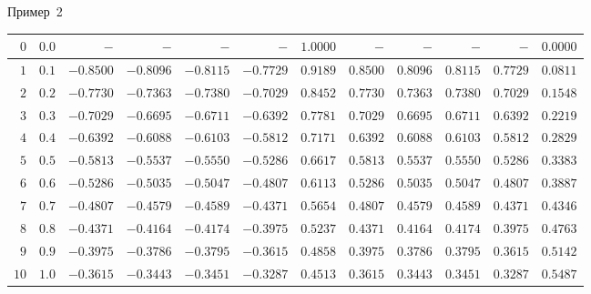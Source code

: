 \documentclass[aspectratio=169, mathserif]{beamer}	%
\begin{document}
\begin{frame}[fragile, label=c]{Пример~2}
\begin{longtable}{|r|r|r|r|r|r|r|r|r|r|r|r|}
	$0$ & $0.0$ & $-$ & $-$ & $-$ & $-$ & $1.0000$ & $-$ & $-$ & $-$ & $-$ & $0.0000$\\
	\hline
	$1$ & $0.1$ & $-0.8500$ & $-0.8096$ & $-0.8115$ & $-0.7729$ & $0.9189$ & $0.8500$ & $0.8096$ & $0.8115$ & $0.7729$ & $0.0811$\\
	\hline
	$2$ & $0.2$ & $-0.7730$ & $-0.7363$ & $-0.7380$ & $-0.7029$ & $0.8452$ & $0.7730$ & $0.7363$ & $0.7380$ & $0.7029$ & $0.1548$\\
	\hline
	$3$ & $0.3$ & $-0.7029$ & $-0.6695$ & $-0.6711$ & $-0.6392$ & $0.7781$ & $0.7029$ & $0.6695$ & $0.6711$ & $0.6392$ & $0.2219$\\
	\hline
	$4$ & $0.4$ & $-0.6392$ & $-0.6088$ & $-0.6103$ & $-0.5812$ & $0.7171$ & $0.6392$ & $0.6088$ & $0.6103$ & $0.5812$ & $0.2829$\\
	\hline
	$5$ & $0.5$ & $-0.5813$ & $-0.5537$ & $-0.5550$ & $-0.5286$ & $0.6617$ & $0.5813$ & $0.5537$ & $0.5550$ & $0.5286$ & $0.3383$\\
	\hline
	$6$ & $0.6$ & $-0.5286$ & $-0.5035$ & $-0.5047$ & $-0.4807$ & $0.6113$ & $0.5286$ & $0.5035$ & $0.5047$ & $0.4807$ & $0.3887$\\
	\hline
	$7$ & $0.7$ & $-0.4807$ & $-0.4579$ & $-0.4589$ & $-0.4371$ & $0.5654$ & $0.4807$ & $0.4579$ & $0.4589$ & $0.4371$ & $0.4346$\\
	\hline
	$8$ & $0.8$ & $-0.4371$ & $-0.4164$ & $-0.4174$ & $-0.3975$ & $0.5237$ & $0.4371$ & $0.4164$ & $0.4174$ & $0.3975$ & $0.4763$\\
	\hline
	$9$ & $0.9$ & $-0.3975$ & $-0.3786$ & $-0.3795$ & $-0.3615$ & $0.4858$ & $0.3975$ & $0.3786$ & $0.3795$ & $0.3615$ & $0.5142$\\
	\hline
	$10$ & $1.0$ & $-0.3615$ & $-0.3443$ & $-0.3451$ & $-0.3287$ & $0.4513$ & $0.3615$ & $0.3443$ & $0.3451$ & $0.3287$ & $0.5487$\\
	\hline
\end{longtable}
\vfill
\end{frame}
\end{document}

